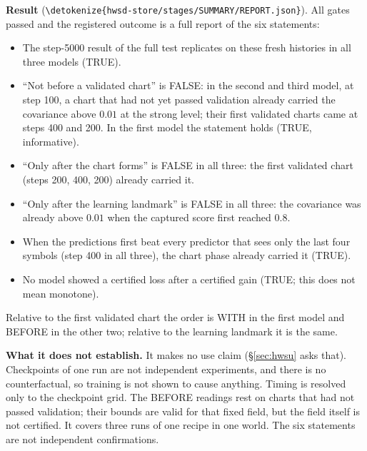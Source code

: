 \documentclass[11pt,a4paper]{article}
\DeclareRobustCommand{\_}{\ifmmode\origunderscore\else\textunderscore\allowbreak\fi}
\DeclareRobustCommand{\fpath}[1]{\begingroup\small\expandafter\nolinkurl\expandafter{\detokenize{#1}}\endgroup}
\begin{document}
\textbf{Result} (\fpath{hwsd-store/stages/SUMMARY/REPORT.json}). All gates passed and the
registered outcome is a full report of the six statements:
\begin{itemize}
\item The step-5000 result of the full test replicates on these fresh histories in all three
models (TRUE).
\item ``Not before a validated chart'' is FALSE: in the second and third model, at step 100, a
chart that had not yet passed validation already carried the covariance above $0.01$ at the
strong level; their first validated charts came at steps 400 and 200. In the first model the
statement holds (TRUE, informative).
\item ``Only after the chart forms'' is FALSE in all three: the first validated chart (steps 200,
400, 200) already carried it.
\item ``Only after the learning landmark'' is FALSE in all three: the covariance was already above
$0.01$ when the captured score first reached 0.8.
\item When the predictions first beat every predictor that sees only the last four symbols (step
400 in all three), the chart phase already carried it (TRUE).
\item No model showed a certified loss after a certified gain (TRUE; this does not mean monotone).
\end{itemize}
Relative to the first validated chart the order is WITH in the first model and BEFORE in the
other two; relative to the learning landmark it is the same.

\textbf{What it does not establish.} It makes no use claim (\S\ref{sec:hwsu} asks that).
Checkpoints of one run are not independent experiments, and there is no counterfactual, so
training is not shown to cause anything. Timing is resolved only to the checkpoint grid. The
BEFORE readings rest on charts that had not passed validation; their bounds are valid for that
fixed field, but the field itself is not certified. It covers three runs of one recipe in one
world. The six statements are not independent confirmations.
\end{document}
